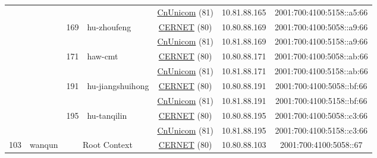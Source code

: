 \begin{small}
\begin{center}
\begin{longtable}{|c|c|c|c|c|c|c|c|}
  &  &  &  & \multicolumn{2}{|c|}{\tiny{\href{http://www.chinaunicom.com}{CnUnicom} (81)}} & \tiny{10.81.88.165} & \tiny{2001:700:4100:5158::a5:66} \\* \cline{3-3}\cline{4-4}\cline{5-5}\cline{6-6}\cline{7-7}\cline{8-8}
  &  & \multirow{2}{*}{\tiny{169}} & \multicolumn{1}{|l|}{\multirow{2}{*}{\tiny{hu-zhoufeng}}} & \multicolumn{2}{|c|}{\tiny{\href{http://www.cernet.edu.cn}{CERNET} (80)}} & \tiny{10.80.88.169} & \tiny{2001:700:4100:5058::a9:66} \\* \cline{5-5}\cline{6-6}\cline{7-7}\cline{8-8}
  &  &  &  & \multicolumn{2}{|c|}{\tiny{\href{http://www.chinaunicom.com}{CnUnicom} (81)}} & \tiny{10.81.88.169} & \tiny{2001:700:4100:5158::a9:66} \\* \cline{3-3}\cline{4-4}\cline{5-5}\cline{6-6}\cline{7-7}\cline{8-8}
  &  & \multirow{2}{*}{\tiny{171}} & \multicolumn{1}{|l|}{\multirow{2}{*}{\tiny{haw-cmt}}} & \multicolumn{2}{|c|}{\tiny{\href{http://www.cernet.edu.cn}{CERNET} (80)}} & \tiny{10.80.88.171} & \tiny{2001:700:4100:5058::ab:66} \\* \cline{5-5}\cline{6-6}\cline{7-7}\cline{8-8}
  &  &  &  & \multicolumn{2}{|c|}{\tiny{\href{http://www.chinaunicom.com}{CnUnicom} (81)}} & \tiny{10.81.88.171} & \tiny{2001:700:4100:5158::ab:66} \\* \cline{3-3}\cline{4-4}\cline{5-5}\cline{6-6}\cline{7-7}\cline{8-8}
  &  & \multirow{2}{*}{\tiny{191}} & \multicolumn{1}{|l|}{\multirow{2}{*}{\tiny{hu-jiangshuihong}}} & \multicolumn{2}{|c|}{\tiny{\href{http://www.cernet.edu.cn}{CERNET} (80)}} & \tiny{10.80.88.191} & \tiny{2001:700:4100:5058::bf:66} \\* \cline{5-5}\cline{6-6}\cline{7-7}\cline{8-8}
  &  &  &  & \multicolumn{2}{|c|}{\tiny{\href{http://www.chinaunicom.com}{CnUnicom} (81)}} & \tiny{10.81.88.191} & \tiny{2001:700:4100:5158::bf:66} \\* \cline{3-3}\cline{4-4}\cline{5-5}\cline{6-6}\cline{7-7}\cline{8-8}
  &  & \multirow{2}{*}{\tiny{195}} & \multicolumn{1}{|l|}{\multirow{2}{*}{\tiny{hu-tanqilin}}} & \multicolumn{2}{|c|}{\tiny{\href{http://www.cernet.edu.cn}{CERNET} (80)}} & \tiny{10.80.88.195} & \tiny{2001:700:4100:5058::c3:66} \\* \cline{5-5}\cline{6-6}\cline{7-7}\cline{8-8}
  &  &  &  & \multicolumn{2}{|c|}{\tiny{\href{http://www.chinaunicom.com}{CnUnicom} (81)}} & \tiny{10.81.88.195} & \tiny{2001:700:4100:5158::c3:66} \\ \hline
 \multirow{30}{*}{\tiny{103}} & \multicolumn{1}{|l|}{\multirow{30}{*}{\tiny{wanqun}}} & \multicolumn{2}{|c|}{\multirow{2}{*}{\tiny{Root Context}}} & \multicolumn{2}{|c|}{\tiny{\href{http://www.cernet.edu.cn}{CERNET} (80)}} & \tiny{10.80.88.103} & \tiny{2001:700:4100:5058::67} \\* \cline{5-5}\cline{6-6}\cline{7-7}\cline{8-8}

\end{longtable}
\end{center}
\end{small}

